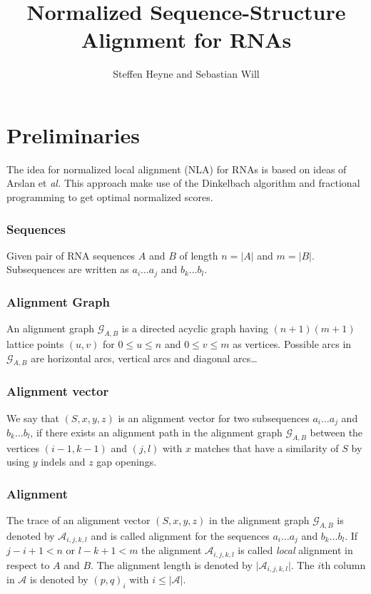 \documentclass{article}
\begin{document}
\title{Normalized Sequence-Structure Alignment for RNAs}
\author{Steffen Heyne and Sebastian Will}
\maketitle

\section{Preliminaries}

The idea for normalized local alignment (NLA) for RNAs is based on ideas of
Arslan et \emph{al.} This approach make use of the Dinkelbach
algorithm and fractional programming to get optimal normalized scores.

\subsubsection*{Sequences}
	
Given pair of RNA sequences $A$ and
$B$ of length $n=\vert A \vert$ and $m=\vert B \vert$. Subsequences are written
as $a_i\dots a_j$ and $b_k\dots b_l$.

\subsubsection*{Alignment Graph}

An alignment graph $\mathcal{G}_{A,B}$ is a directed acyclic graph  having
$(n+1)(m+1)$ lattice points $(u,v)$ for $0\leq u \leq n$ and $0\leq v \leq m$
as vertices. Possible arcs in $\mathcal{G}_{A,B}$ are horizontal arcs, vertical
arcs and diagonal arcs\ldots

\subsubsection*{Alignment vector}

We say that $(S,x,y,z)$ is an alignment vector for two subsequences $a_i\dots a_j$
and $b_k\dots b_l$, if there exists an alignment path in
the alignment graph $\mathcal{G}_{A,B}$ between the vertices $(i-1,k-1)$ and
$(j,l)$ with $x$ matches that have a similarity of $S$ by using $y$ indels and
$z$ gap openings.

\subsubsection*{Alignment}

The trace of an alignment vector $(S,x,y,z)$ in the alignment graph
$\mathcal{G}_{A,B}$ is denoted by $\mathcal{A}_{i,j,k,l}$ and is called 
alignment for the sequences $a_i\dots a_j$ and $b_k\dots b_l$. If $j-i+1 < n$
or $l-k+1 < m$ the alignment $\mathcal{A}_{i,j,k,l}$ is called \emph{local}
alignment in respect to $A$ and $B$. The alignment length is denoted by
$\vert \mathcal{A}_{i,j,k,l}\vert$. The $i$th column in $\mathcal{A}$ is
denoted by $(p,q)_i$ with $i\leq \vert \mathcal{A}\vert$.
\end{document}
